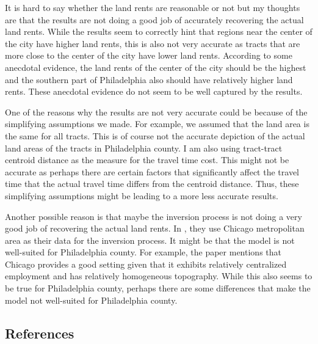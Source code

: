 \documentclass[
  11pt]{article}
\begin{document}
\normalsize

It is hard to say whether the land rents are reasonable or not but my
thoughts are that the results are not doing a good job of accurately
recovering the actual land rents. While the results seem to correctly
hint that regions near the center of the city have higher land rents,
this is also not very accurate as tracts that are more close to the
center of the city have lower land rents. According to some anecdotal
evidence, the land rents of the center of the city should be the highest
and the southern part of Philadelphia also should have relatively higher
land rents. These anecdotal evidence do not seem to be well captured by
the results.

One of the reasons why the results are not very accurate could be
because of the simplifying assumptions we made. For example, we assumed
that the land area is the same for all tracts. This is of course not the
accurate depiction of the actual land areas of the tracts in
Philadelphia county. I am also using tract-tract centroid distance as
the measure for the travel time cost. This might not be accurate as
perhaps there are certain factors that significantly affect the travel
time that the actual travel time differs from the centroid distance.
Thus, these simplifying assumptions might be leading to a more less
accurate results.

Another possible reason is that maybe the inversion process is not doing
a very good job of recovering the actual land rents. In
\citet{brinkman2024}, they use Chicago metropolitan area as their data
for the inversion process. It might be that the model is not well-suited
for Philadelphia county. For example, the paper mentions that Chicago
provides a good setting given that it exhibits relatively centralized
employment and has relatively homogeneous topography. While this also
seems to be true for Philadelphia county, perhaps there are some
differences that make the model not well-suited for Philadelphia county.

\clearpage

\subsection*{References}\label{references}

\renewcommand{\bibsection}{}


\clearpage

\label{appendix}
\bigskip
\end{document}
